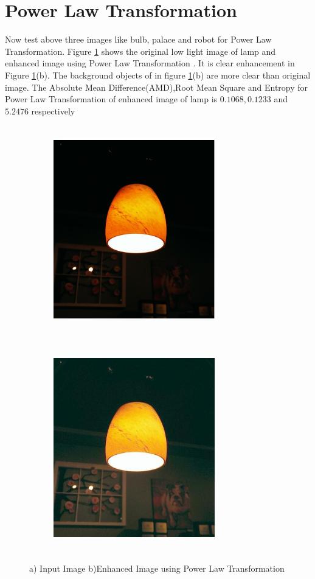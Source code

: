 \section{Power Law Transformation}
Now test above three images like bulb, palace and robot for Power Law Transformation. Figure \ref{fig:powerLaw} shows the original low light image of lamp and enhanced image using Power Law Transformation . It is clear enhancement in Figure \ref{fig:powerLaw}(b). The background objects of in figure \ref{fig:powerLaw}(b) are more clear than original image. The Absolute Mean Difference(AMD),Root Mean Square and Entropy for Power Law Transformation of enhanced image of lamp is $0.1068,0.1233$ and $5.2476$ respectively      


\begin{figure}
	\begin{subfigure}{8cm}
		\centering    
    	\includegraphics[width=7cm,height=9cm,keepaspectratio]{images/ch5/bulb_input.jpg}
    	\caption{} 
    \end{subfigure}
  	\begin{subfigure}{6cm}
  		\centering
  		\includegraphics[width=7cm,height=9cm,keepaspectratio]{images/ch5/bulb_power.jpg}
   		\caption{}
  	\end{subfigure}
  	\caption{a) Input Image b)Enhanced Image using Power Law Transformation}
  	\label{fig:powerLaw}
\end{figure}

